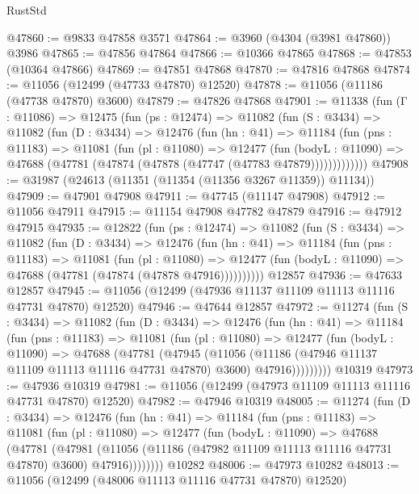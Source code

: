 \begin{lexlean}{RustStd}
\begin{coremodule}
@47860 := @9833 @47858 @3571
@47864 := @3960 (@4304 (@3981 @47860)) @3986
@47865 := @47856 @47864
@47866 := @10366 @47865
@47868 := @47853 (@10364 @47866)
@47869 := @47851 @47868
@47870 := @47816 @47868
@47874 := @11056 (@12499 (@47733 @47870) @12520)
@47878 := @11056 (@11186 (@47738 @47870) @3600)
@47879 := @47826 @47868
@47901 := @11338
    (fun (Γ : @11086) =>
    @12475
      (fun (ps : @12474) =>
      @11082
        (fun (S : @3434) =>
        @11082
          (fun (D : @3434) =>
          @12476
            (fun (hn : @41) =>
            @11184
              (fun (pns : @11183) =>
              @11081
                (fun (pl : @11080) =>
                @12477
                  (fun (bodyL : @11090) =>
                  @47688 (@47781 (@47874 (@47878 (@47747 (@47783 @47879)))))))))))))
@47908 := @31987 (@24613 (@11351 (@11354 (@11356 @3267 @11359)) @11134))
@47909 := @47901 @47908
@47911 := @47745 (@11147 @47908)
@47912 := @11056 @47911
@47915 := @11154 @47908 @47782 @47879
@47916 := @47912 @47915
@47935 := @12822
    (fun (ps : @12474) =>
    @11082
      (fun (S : @3434) =>
      @11082
        (fun (D : @3434) =>
        @12476
          (fun (hn : @41) =>
          @11184
            (fun (pns : @11183) =>
            @11081
              (fun (pl : @11080) =>
              @12477 (fun (bodyL : @11090) => @47688 (@47781 (@47874 (@47878 @47916))))))))))
    @12857
@47936 := @47633 @12857
@47945 := @11056 (@12499 (@47936 @11137 @11109 @11113 @11116 @47731 @47870) @12520)
@47946 := @47644 @12857
@47972 := @11274
    (fun (S : @3434) =>
    @11082
      (fun (D : @3434) =>
      @12476
        (fun (hn : @41) =>
        @11184
          (fun (pns : @11183) =>
          @11081
            (fun (pl : @11080) =>
            @12477
              (fun (bodyL : @11090) =>
              @47688
                (@47781
                  (@47945
                    (@11056
                      (@11186 (@47946 @11137 @11109 @11113 @11116 @47731 @47870) @3600)
                      @47916)))))))))
    @10319
@47973 := @47936 @10319
@47981 := @11056 (@12499 (@47973 @11109 @11113 @11116 @47731 @47870) @12520)
@47982 := @47946 @10319
@48005 := @11274
    (fun (D : @3434) =>
    @12476
      (fun (hn : @41) =>
      @11184
        (fun (pns : @11183) =>
        @11081
          (fun (pl : @11080) =>
          @12477
            (fun (bodyL : @11090) =>
            @47688
              (@47781
                (@47981
                  (@11056 (@11186 (@47982 @11109 @11113 @11116 @47731 @47870) @3600) @47916))))))))
    @10282
@48006 := @47973 @10282
@48013 := @11056 (@12499 (@48006 @11113 @11116 @47731 @47870) @12520)

\end{coremodule}
\end{lexlean}
